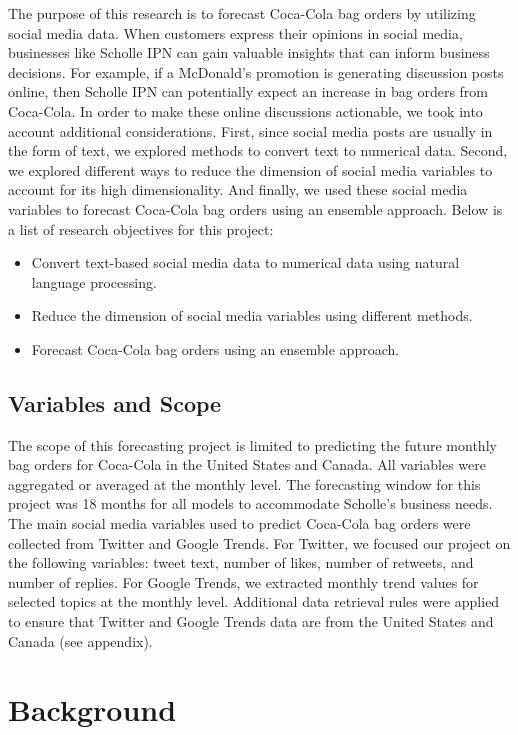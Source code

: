 \documentclass[12pt,oneside]{chicagocapstone}
\providecommand{\tightlist}{%
  \setlength{\itemsep}{0pt}\setlength{\parskip}{0pt}}
\begin{document}
The purpose of this research is to forecast Coca-Cola bag orders by utilizing social media data. When customers express their opinions in social media, businesses like Scholle IPN can gain valuable insights that can inform business decisions. For example, if a McDonald's promotion is generating discussion posts online, then Scholle IPN can potentially expect an increase in bag orders from Coca-Cola. In order to make these online discussions actionable, we took into account additional considerations. First, since social media posts are usually in the form of text, we explored methods to convert text to numerical data. Second, we explored different ways to reduce the dimension of social media variables to account for its high dimensionality. And finally, we used these social media variables to forecast Coca-Cola bag orders using an ensemble approach. Below is a list of research objectives for this project:
\begin{itemize}
\tightlist
\item
  Convert text-based social media data to numerical data using natural language processing.
\item
  Reduce the dimension of social media variables using different methods.
\item
  Forecast Coca-Cola bag orders using an ensemble approach.
\end{itemize}
\hypertarget{variables-and-scope}{%
\section*{Variables and Scope}\label{variables-and-scope}}

The scope of this forecasting project is limited to predicting the future monthly bag orders for Coca-Cola in the United States and Canada. All variables were aggregated or averaged at the monthly level. The forecasting window for this project was 18 months for all models to accommodate Scholle's business needs. The main social media variables used to predict Coca-Cola bag orders were collected from Twitter and Google Trends. For Twitter, we focused our project on the following variables: tweet text, number of likes, number of retweets, and number of replies. For Google Trends, we extracted monthly trend values for selected topics at the monthly level. Additional data retrieval rules were applied to ensure that Twitter and Google Trends data are from the United States and Canada (see appendix).

\hypertarget{background}{%
\chapter*{Background}\label{background}}
\end{document}
